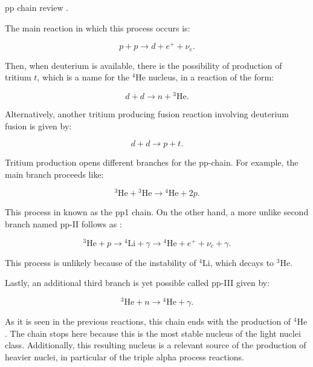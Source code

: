 \documentclass[openany]{book}
\begin{document}
pp chain review \cite{fowler_1958}.

The main reaction in which this process occurs is: 

\begin{equation} \label{eq:reaction_ppMain}
	p + p \rightarrow d + e^{+} + \nu_e.
\end{equation}

Then, when deuterium is available, there is the possibility of production of tritium $t$, which is a name for the  $\mathrm{{}^{4}He}$ nucleus,  in a reaction of the form:

\begin{equation} \label{eq:reaction_2Hdn3He}
	d + d  \rightarrow n + {}^{3} \mathrm{He}.
\end{equation}

Alternatively, another tritium producing  fusion reaction involving deuterium fusion is given by:

\begin{equation}  \label{eq:reaction_2Hdpt}
	d + d \rightarrow p + t.
\end{equation}

Tritium production opens different branches for the pp-chain. For example, the main branch proceeds like: 

\begin{equation} \label{eq:reaction_3Hep3He}
	{}^{3}\mathrm{He} +  {}^{3}\mathrm{He}  \rightarrow {}^{4}\mathrm{He} + 2p.
\end{equation}

This process in known as the pp1 chain. On the other hand, a more unlike second branch named pp-II follows as :

\begin{equation} \label{eq:reaction_3HepChain}
	{}^{3}\mathrm{He} + p \rightarrow {}^{4}\mathrm{Li} + \gamma \rightarrow {}^{4}\mathrm{He} + e^{+} +  \nu_e + \gamma.
\end{equation}

This process is unlikely because of the instability of  ${}^{4}\mathrm{Li}$, which decays to ${}^{3}\mathrm{He}$.

Lastly, an additional third branch is yet possible called pp-III given by: 

\begin{equation} \label{eq:reaction_3HepChain_III}
	{}^{3}\mathrm{He} + n \rightarrow {}^{4}\mathrm{He} +  \gamma.
\end{equation}

As it is seen in the previous reactions, this chain ends with the production of $\mathrm{{}^{4}He}$. The chain stops here because this is the most stable nucleus of the light nuclei class. Additionally, this resulting nucleus is a relevant source of the production of heavier nuclei, in particular of the triple alpha process reactions.
\end{document}
